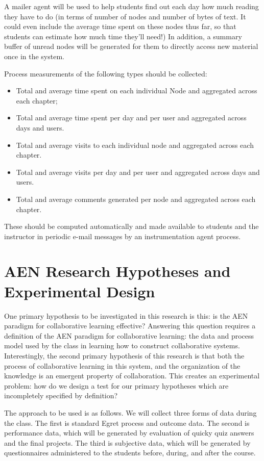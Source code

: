 A mailer agent will be used to help students find out each day how much
reading they have to do (in terms of number of nodes and number of bytes of
text. It could even include the average time spent on these nodes thus far,
so that students can estimate how much time they'll need!)  In addition, a
summary buffer of unread nodes will be generated for them to directly
access new material once in the system. 

Process measurements of the following types should be collected:
\begin{itemize}
\item Total and average time spent on each individual Node and aggregated
  across each chapter;
\item Total and average time spent per day and per user and aggregated
  across days and users.
\item Total and average visits to each individual node and aggregated across
  each chapter.
\item Total and average visits per day and per user and aggregated across
  days and users.
\item Total and average comments generated per node and aggregated across
  each chapter.
\end{itemize}

These should be computed automatically and made available to students and
the instructor in periodic e-mail messages by an instrumentation agent
process. 


\section{AEN Research Hypotheses and Experimental Design}

One primary hypothesis to be investigated in this research is this: is
the AEN paradigm for collaborative learning effective?  Answering this
question requires a definition of the AEN paradigm for collaborative
learning: the data and process model used by the class in learning how
to construct collaborative systems.
Interestingly, the second primary hypothesis of this research is that
both the process of collaborative learning in this system, and the
organization of the knowledge is an emergent property of
collaboration.  This creates an experimental problem: how do we design
a test for our primary hypotheses which are incompletely specified
by definition?

The approach to be used is as follows.  We will collect three forms of
data during the class.  The first is standard Egret process and
outcome data. The second is performance data, which will be generated
by evaluation of quicky quiz answers and the final projects.  The
third is subjective data, which will be generated by questionnaires
administered to the students before, during, and after the course.






